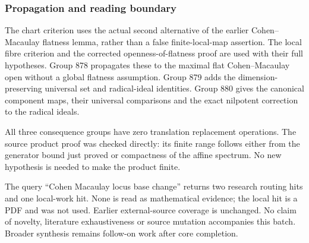 \subsubsection{Propagation and reading boundary}\label{algebra-proof-040-propagation-and-reading-boundary}

The chart criterion uses the actual second alternative of the earlier Cohen--Macaulay flatness lemma, rather than a false finite-local-map assertion. The local fibre criterion and the corrected openness-of-flatness proof are used with their full hypotheses. Group 878 propagates these to the maximal flat Cohen--Macaulay open without a global flatness assumption. Group 879 adds the dimension-preserving universal set and radical-ideal identities. Group 880 gives the canonical component maps, their universal comparisons and the exact nilpotent correction to the radical ideals.

All three consequence groups have zero translation replacement operations. The source product proof was checked directly: its finite range follows either from the generator bound just proved or compactness of the affine spectrum. No new hypothesis is needed to make the product finite.

The query ``Cohen Macaulay locus base change'' returns two research routing hits and one local-work hit. None is read as mathematical evidence; the local hit is a PDF and was not used. Earlier external-source coverage is unchanged. No claim of novelty, literature exhaustiveness or source mutation accompanies this batch. Broader synthesis remains follow-on work after core completion.
